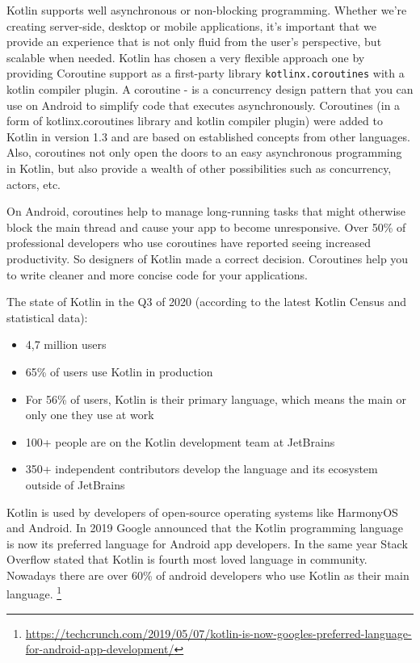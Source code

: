 Kotlin supports well asynchronous or non-blocking programming. Whether we're creating server-side, desktop or mobile applications, it's important that we provide an experience that is not only fluid from the user's perspective, but scalable when needed. Kotlin has chosen a very flexible approach one by providing Coroutine support as a first-party library  \texttt{kotlinx.coroutines} with a kotlin compiler plugin. A coroutine - is a concurrency design pattern that you can use on Android to simplify code that executes asynchronously. Coroutines (in a form of kotlinx.coroutines library and kotlin compiler plugin) were added to Kotlin in version 1.3 and are based on established concepts from other languages. Also, coroutines not only open the doors to an easy asynchronous programming in Kotlin, but also provide a wealth of other possibilities such as concurrency, actors, etc.

On Android, coroutines help to manage long-running tasks that might otherwise block the main thread and cause your app to become unresponsive. Over 50\% of professional developers who use coroutines have reported seeing increased productivity. So designers of Kotlin made a correct decision. Coroutines help you to write cleaner and more concise code for your applications.

The state of Kotlin in the Q3 of 2020 (according to the latest Kotlin Census and statistical data):
\begin{itemize}
    \item 4,7 million users
    \item 65\% of users use Kotlin in production
    \item For 56\% of users, Kotlin is their primary language, which means the main or only
    one they use at work
    \item 100+ people are on the Kotlin development team at JetBrains
    \item 350+ independent contributors develop the language and its ecosystem outside
    of JetBrains
\end{itemize}

Kotlin is used by developers of open-source operating systems like HarmonyOS and Android. In 2019 Google announced that the Kotlin programming language is now its preferred language for Android app developers. In the same year Stack Overflow stated that Kotlin is fourth most loved language in community. Nowadays there are over 60\% of android developers who use Kotlin as their main language. \footnote{\url{https://techcrunch.com/2019/05/07/kotlin-is-now-googles-preferred-language-for-android-app-development/}}


